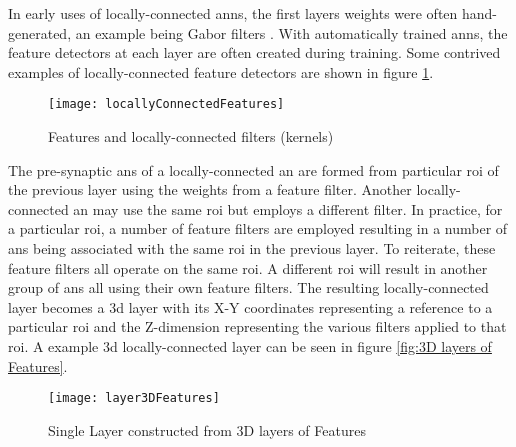 \iffalse With locally-connected layers, the connection weights of the pre-synaptic \acp{an} are often formed from wanting to identify particular features. \fi
In early uses of locally-connected \acp{ann}, the first layers weights were often hand-generated, an example being Gabor filters \cite{Kwolek2005}. 
With automatically trained \acp{ann}, the feature detectors at each layer are often created during training.
Some contrived examples of locally-connected feature detectors are shown in figure \ref{fig:Features and locally-connected filters (kernels)}.
\begin{figure}[h]
\centering
    \texttt{[image: locallyConnectedFeatures]}
    \captionsetup{justification=centering, skip=5pt}
    \caption{Features and locally-connected filters (kernels)}
    \label{fig:Features and locally-connected filters (kernels)}
\end{figure}

The pre-synaptic \acp{an} of a locally-connected \ac{an} are formed from particular \ac{roi} of the previous layer using the weights from a feature filter. 
Another locally-connected \ac{an} may use the same \ac{roi} but employs a different filter.
In practice, for a particular \ac{roi}, a number of feature filters are employed resulting in a number of \acp{an} being associated with the same \ac{roi} in the previous layer. 
To reiterate, these feature filters all operate on the same \ac{roi}.
A different \ac{roi} will result in another group of \acp{an} all using their own feature filters.
The resulting locally-connected layer becomes a \ac{3d} layer with its X-Y coordinates representing a reference to a particular \ac{roi} and the Z-dimension representing the various filters applied to that \ac{roi}.
A example \ac{3d} locally-connected layer can be seen in figure \ref{fig:3D layers of Features}.

\iffalse
A good example of the feature filters is image recognition \acp{ann}. The lower level features generated during automatic training are often intuitive and the filters are constructed to detect small features such as lines at various angles, different curves etc..
In the general \ac{dnn} case, the trained feature detectors may not be as intuitive.
\fi

\begin{figure}[h]
\centering
    \texttt{[image: layer3DFeatures]}
    \captionsetup{justification=centering, skip=5pt}
    \caption{Single Layer constructed from 3D layers of Features}
    \label{fig:3D layers of Features}
\label{fig:Layer Features}
\end{figure}


